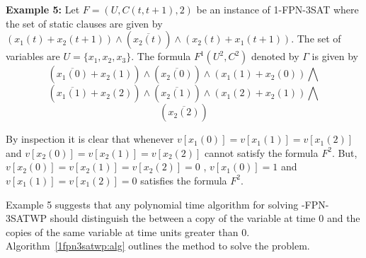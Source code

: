 	 
\noindent
{\bf Example 5:}
Let $F= (U,C(t,t+1),2)$
be an instance of  1-FPN-3SAT where the set of static clauses are given by
$(x_1(t) + x_2(t+1))  \wedge 
(\overline{x_2(t)}) \wedge (x_2(t) + x_1(t+1))$.
The set of variables are $U = \{ x_1, x_2, x_3 \}$.
The formula $F^1(U^2,C^2)$ denoted by $\Gamma$ is given by 
\[(\overline{x_1(0)} + x_2(1)) \wedge (\overline{x_2(0)}) 
\wedge (x_1(1) + x_2(0)) \bigwedge \]
\[(\overline{x_1(1)} + x_2(2)) \wedge (\overline{x_2(1)}) 
\wedge (x_1(2) + x_2(1)) \bigwedge \]
\[(\overline{x_2(2)}) \]

By inspection it is clear that whenever $v[x_1(0)] = v[x_1(1)] = v[x_1(2)]$ and
$v[x_2(0)] = v[x_2(1)] = v[x_2(2)]$ cannot satisfy the formula $F^2$. But,
$v[x_2(0)] = v[x_2(1)] = v[x_2(2)] =0$ , $v[x_1(0)] = 1$ and 
$v[x_1(1)] = v[x_1(2)] = 0$  satisfies the formula $F^2$. \hfill\QED 




Example  5 suggests that any polynomial time  algorithm for
solving {-FPN-3SATWP} should distinguish the between a copy of the
variable at time 0 and the copies of the same variable at time units greater
than 0.  
Algorithm~\ref{1fpn3satwp:alg} outlines the method to solve the problem.




\tinyspacing

